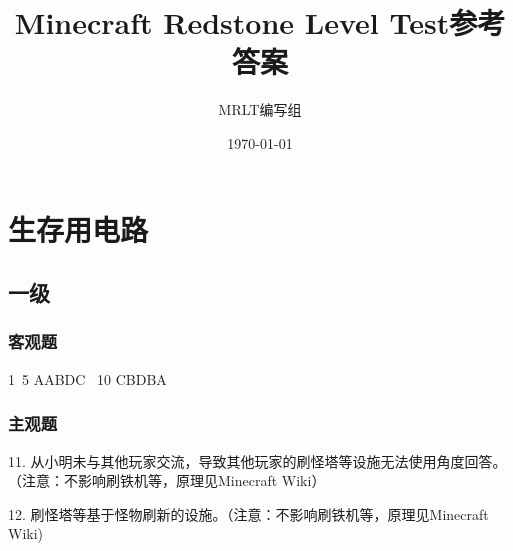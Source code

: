 \documentclass{ctexart}
\title{\textbf{Minecraft Redstone Level Test参考答案}}
\author{MRLT编写组}
\date{\today}
\begin{document}
    \maketitle

    \tableofcontents

    \section{生存用电路}
        \subsection{一级}
            \subsubsection{客观题}
                1~5 AABDC ~10 CBDBA
            
            \subsubsection{主观题}
                11. 从小明未与其他玩家交流，导致其他玩家的刷怪塔等设施无法使用角度回答。（注意：不影响刷铁机等，原理见Minecraft Wiki）
                
                12. 刷怪塔等基于怪物刷新的设施。（注意：不影响刷铁机等，原理见Minecraft Wiki)
\end{document}
